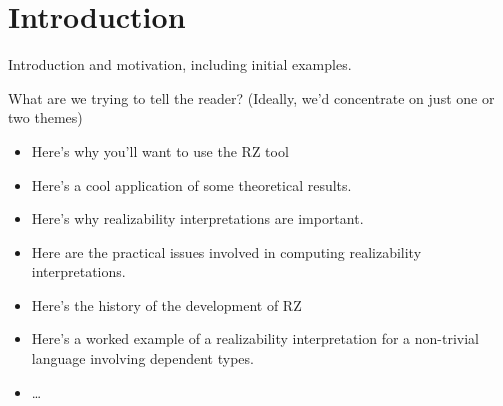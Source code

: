 \section{Introduction}
\label{sec:introduction}

Introduction and motivation, including initial examples.

What are we trying to tell the reader?  (Ideally, we'd concentrate on just one or two themes)
\begin{itemize}
\item Here's why you'll want to use the RZ tool
\item Here's a cool application of some theoretical results.
\item Here's why realizability interpretations
  are important.
\item Here are the practical issues involved in computing realizability
  interpretations.
\item Here's the history of the development of RZ
\item Here's a worked example of a realizability interpretation for a non-trivial language involving dependent types.
\item \ldots
\end{itemize}




